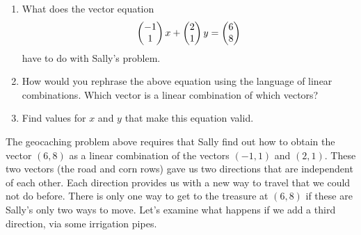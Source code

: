 \begin{problem}
\begin{enumerate}
 \item 
What does the vector equation 
$$\begin{pmatrix} -1\\1 \end{pmatrix}x+\begin{pmatrix} 2\\1 \end{pmatrix}y=\begin{pmatrix} 6\\8 \end{pmatrix}$$ 
have to do with Sally's problem.
 \item 
How would you rephrase the above equation using the language of linear combinations.  Which vector is a linear combination of which vectors?
 \item 
Find values for $x$ and $y$ that make this equation valid.
\end{enumerate}
\end{problem}

The geocaching problem above requires that Sally find out how to obtain the vector $(6,8)$ as a linear combination of the vectors $(-1,1)$ and $(2,1)$.  These two vectors (the road and corn rows) gave us two directions that are independent of each other.  Each direction provides us with a new way to travel that we could not do before. There is only one way to get to the treasure at $(6,8)$ if these are Sally's only two ways to move. Let's examine what happens if we add a third direction, via some irrigation pipes.


